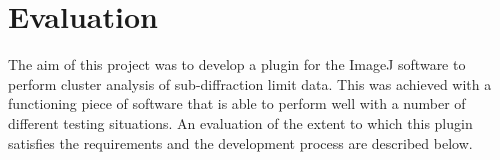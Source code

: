 
\part{Evaluation}
\label{prt:evaluation}

The aim of this project was to develop a plugin for the ImageJ software to
perform cluster analysis of sub-diffraction limit data. This was achieved with
a functioning piece of software that is able to perform well with a number of
different testing situations. An evaluation of the extent to which this plugin
satisfies the requirements and the development process are described below.
